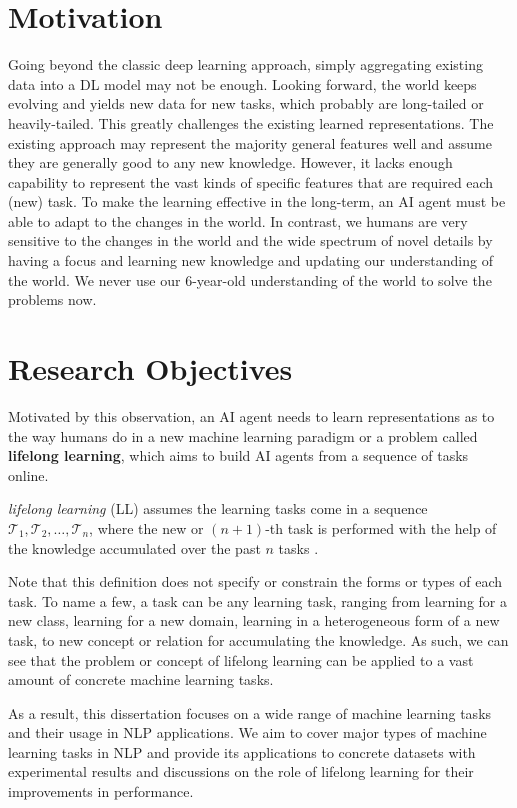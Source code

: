 \section{Motivation}
\label{chap1:motivation}
Going beyond the classic deep learning approach, simply aggregating existing data into a DL model may not be enough.
Looking forward, the world keeps evolving and yields new data for new tasks, which probably are long-tailed or heavily-tailed.
This greatly challenges the existing learned representations.
The existing approach may represent the majority general features well and assume they are generally good to any new knowledge.
However, it lacks enough capability to represent the vast kinds of specific features that are required each (new) task.
To make the learning effective in the long-term, an AI agent must be able to adapt to the changes in the world.
In contrast, we humans are very sensitive to the changes in the world and the wide spectrum of novel details by having a focus and learning new knowledge and updating our understanding of the world.
We never use our 6-year-old understanding of the world to solve the problems now. 

\section{Research Objectives}
Motivated by this observation, an AI agent needs to learn representations as to the way humans do in a new machine learning paradigm or a problem called \textbf{lifelong learning}, which aims to build AI agents from a sequence of tasks online.

\textit{lifelong learning} (LL) assumes the learning tasks come in a sequence $\mathcal{T}_1, \mathcal{T}_2, \dots, \mathcal{T}_n$, where the new or $(n+1)$-th task is performed with the help of the knowledge accumulated over the past $n$ tasks \cite{ChenLiu2016,ChenLiu2018}. 

Note that this definition does not specify or constrain the forms or types of each task.
To name a few, a task can be any learning task, ranging from learning for a new class, learning for a new domain, learning in a heterogeneous form of a new task, to new concept or relation for accumulating the knowledge.
As such, we can see that the problem or concept of lifelong learning can be applied to a vast amount of concrete machine learning tasks.

As a result, this dissertation focuses on a wide range of machine learning tasks and their usage in NLP applications.
We aim to cover major types of machine learning tasks in NLP and provide its applications to concrete datasets with experimental results and discussions on the role of lifelong learning for their improvements in performance.

